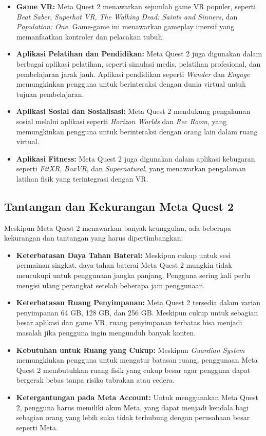 \begin{itemize}
    \item \textbf{Game VR:} Meta Quest 2 menawarkan sejumlah game VR populer, seperti \textit{Beat Saber}, \textit{Superhot VR}, \textit{The Walking Dead: Saints and Sinners}, dan \textit{Population: One}. Game-game ini menawarkan gameplay imersif yang memanfaatkan kontroler dan pelacakan tubuh.
    \item \textbf{Aplikasi Pelatihan dan Pendidikan:} Meta Quest 2 juga digunakan dalam berbagai aplikasi pelatihan, seperti simulasi medis, pelatihan profesional, dan pembelajaran jarak jauh. Aplikasi pendidikan seperti \textit{Wander} dan \textit{Engage} memungkinkan pengguna untuk berinteraksi dengan dunia virtual untuk tujuan pembelajaran.
    \item \textbf{Aplikasi Sosial dan Sosialisasi:} Meta Quest 2 mendukung pengalaman sosial melalui aplikasi seperti \textit{Horizon Worlds} dan \textit{Rec Room}, yang memungkinkan pengguna untuk berinteraksi dengan orang lain dalam ruang virtual.
    \item \textbf{Aplikasi Fitness:} Meta Quest 2 juga digunakan dalam aplikasi kebugaran seperti \textit{FitXR}, \textit{BoxVR}, dan \textit{Supernatural}, yang menawarkan pengalaman latihan fisik yang terintegrasi dengan VR.
\end{itemize}

\subsection{Tantangan dan Kekurangan Meta Quest 2}
\label{subsec:tantanganmetaquest2}

Meskipun Meta Quest 2 menawarkan banyak keunggulan, ada beberapa kekurangan dan tantangan yang harus dipertimbangkan:

\begin{itemize}
    \item \textbf{Keterbatasan Daya Tahan Baterai:} Meskipun cukup untuk sesi permainan singkat, daya tahan baterai Meta Quest 2 mungkin tidak mencukupi untuk penggunaan jangka panjang. Pengguna sering kali perlu mengisi ulang perangkat setelah beberapa jam penggunaan.
    \item \textbf{Keterbatasan Ruang Penyimpanan:} Meta Quest 2 tersedia dalam varian penyimpanan 64 GB, 128 GB, dan 256 GB. Meskipun cukup untuk sebagian besar aplikasi dan game VR, ruang penyimpanan terbatas bisa menjadi masalah jika pengguna ingin mengunduh banyak konten.
    \item \textbf{Kebutuhan untuk Ruang yang Cukup:} Meskipun \textit{Guardian System} memungkinkan pengguna untuk mengatur batasan ruang, penggunaan Meta Quest 2 membutuhkan ruang fisik yang cukup besar agar pengguna dapat bergerak bebas tanpa risiko tabrakan atau cedera.
    \item \textbf{Ketergantungan pada Meta Account:} Untuk menggunakan Meta Quest 2, pengguna harus memiliki akun Meta, yang dapat menjadi kendala bagi sebagian orang yang lebih suka tidak terhubung dengan perusahaan besar seperti Meta.
\end{itemize}

